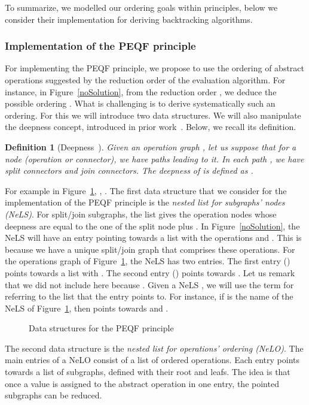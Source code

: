 \documentclass[a4paper]{article}
\newtheorem{definition}{Definition}
\begin{document}
To summarize, we modelled our ordering goals within principles, below we consider their implementation for deriving 
backtracking algorithms. 

\subsubsection{Implementation of the PEQF principle}

For implementing the PEQF principle, we propose to use the ordering of abstract operations suggested by 
the reduction order of the evaluation algorithm. For instance, in Figure~\ref{noSolution}, from the 
reduction order , we deduce the possible ordering . 
What is challenging is to derive systematically such an ordering. For this we will  
introduce two data structures. We will also manipulate the deepness concept, introduced in 
prior work~\cite{GoldmanNgoko}. Below, we recall its definition. 
\begin{definition}[Deepness~\cite{GoldmanNgoko}]
Given an operation graph , let us suppose that for a node  (operation or connector),  
we have  paths  leading to it. In each path , we have  
split connectors and  join connectors. The deepness of  is defined 
as .
\end{definition}
For example in Figure~\ref{dataStructure}, , . 
The first data structure that we consider for the implementation of the PEQF principle is the  
 {\it nested list for subgraphs' nodes (NeLS)}. For split/join subgraphs, the list gives the 
operation nodes whose deepness are equal to the one of the split node plus . In Figure~\ref{noSolution}, 
the NeLS will have an entry  pointing towards a list with the operations  and . 
This is because we have a unique split/join graph that comprises these
operations. For the operations graph of Figure~\ref{dataStructure}, the NeLS has two 
entries. The first entry () points towards a list with . The second entry () 
points towards . Let us remark that we did not include  here because
. Given a NeLS , we will use the term  for referring 
to the list that the entry  points to. For instance, if  is the name of the NeLS of 
Figure~\ref{dataStructure}, then   points towards  and . 

\begin{figure}[htbp]
\centering
{}
\caption{Data structures for the PEQF principle}\label{dataStructure}
\end{figure}

The second data structure is the {\it nested list for operations' ordering (NeLO)}. The main entries of a NeLO consist 
of a list of ordered operations. Each entry points towards a list of subgraphs, defined with their root 
and leafs. The idea is that once a value is assigned to the abstract operation in one entry, the pointed 
subgraphs can be reduced. 
\end{document}
